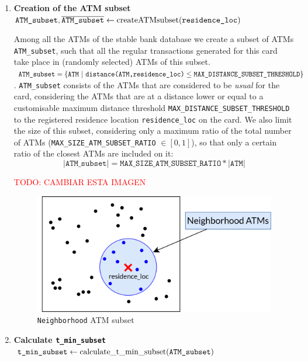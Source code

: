 \begin{enumerate}
    \item \textbf{Creation of the ATM subset} \\
    {\footnotesize \textcolor{teal}{$\texttt{ATM\_subset}, \overline{\texttt{ATM\_subset}} \gets \text{createATMsubset(\texttt{residence\_loc})}$}}
    
    Among all the ATMs of the stable bank database we create a subset of ATMs \texttt{ATM\_subset}, such that all the regular transactions generated for this card take place in (randomly selected) ATMs of this subset. 
    $\texttt{ATM\_subset} = \{\texttt{ATM}\
    |\ \texttt{distance(ATM,residence\_loc)} \\ \leq \texttt{MAX\_DISTANCE\_SUBSET\_THRESHOLD}\}$. \texttt{ATM\_subset} consists of the ATMs that are considered to be \textit{usual} for the card, considering the ATMs that are at a distance lower or equal to a customisable maximum distance threshold \texttt{MAX\_DISTANCE\_SUBSET\_THRESHOLD} to the registered residence location \texttt{residence\_loc} on the card. We also limit the size of this subset, considering only a maximum ratio of the total number of ATMs (\texttt{MAX\_SIZE\_ATM\_SUBSET\_RATIO} $\in [0,1]$), so that only a certain ratio of the closest ATMs are included on it: 
    $$|\texttt{ATM\_subset}| = \texttt{MAX\_SIZE\_ATM\_SUBSET\_RATIO} * |\texttt{ATM}|$$ 

\textcolor{red}{TODO: CAMBIAR ESTA IMAGEN}
    \begin{figure}[H]
      \centering
      \includegraphics[scale=1.1]{images/1-DataModel/tx-generation-1-named.png}
      \caption{\texttt{Neighborhood} ATM subset}
    \end{figure}

    \item \textbf{Calculate \texttt{t\_min\_subset}} \\
    {\footnotesize\textcolor{teal}{$\texttt{t\_min\_subset} \gets \text{calculate\_t\_min\_subset(\texttt{ATM\_subset})}$}}
    

\end{enumerate}
